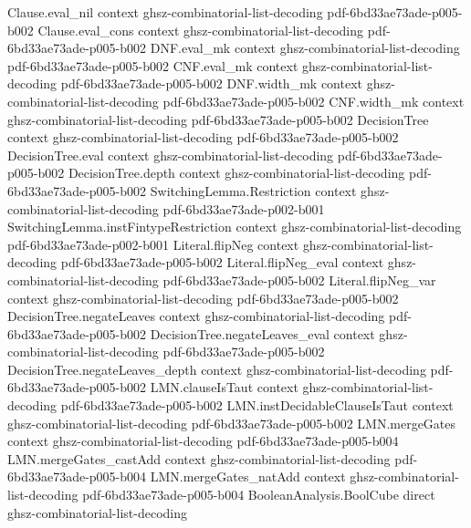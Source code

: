 \begin{theorem}
\proofstep
  {Clause.eval_nil}
  {context}
  {ghsz-combinatorial-list-decoding}
  {pdf-6bd33ae73ade-p005-b002}
\proofstep
  {Clause.eval_cons}
  {context}
  {ghsz-combinatorial-list-decoding}
  {pdf-6bd33ae73ade-p005-b002}
\proofstep
  {DNF.eval_mk}
  {context}
  {ghsz-combinatorial-list-decoding}
  {pdf-6bd33ae73ade-p005-b002}
\proofstep
  {CNF.eval_mk}
  {context}
  {ghsz-combinatorial-list-decoding}
  {pdf-6bd33ae73ade-p005-b002}
\proofstep
  {DNF.width_mk}
  {context}
  {ghsz-combinatorial-list-decoding}
  {pdf-6bd33ae73ade-p005-b002}
\proofstep
  {CNF.width_mk}
  {context}
  {ghsz-combinatorial-list-decoding}
  {pdf-6bd33ae73ade-p005-b002}
\proofstep
  {DecisionTree}
  {context}
  {ghsz-combinatorial-list-decoding}
  {pdf-6bd33ae73ade-p005-b002}
\proofstep
  {DecisionTree.eval}
  {context}
  {ghsz-combinatorial-list-decoding}
  {pdf-6bd33ae73ade-p005-b002}
\proofstep
  {DecisionTree.depth}
  {context}
  {ghsz-combinatorial-list-decoding}
  {pdf-6bd33ae73ade-p005-b002}
\proofstep
  {SwitchingLemma.Restriction}
  {context}
  {ghsz-combinatorial-list-decoding}
  {pdf-6bd33ae73ade-p002-b001}
\proofstep
  {SwitchingLemma.instFintypeRestriction}
  {context}
  {ghsz-combinatorial-list-decoding}
  {pdf-6bd33ae73ade-p002-b001}
\proofstep
  {Literal.flipNeg}
  {context}
  {ghsz-combinatorial-list-decoding}
  {pdf-6bd33ae73ade-p005-b002}
\proofstep
  {Literal.flipNeg_eval}
  {context}
  {ghsz-combinatorial-list-decoding}
  {pdf-6bd33ae73ade-p005-b002}
\proofstep
  {Literal.flipNeg_var}
  {context}
  {ghsz-combinatorial-list-decoding}
  {pdf-6bd33ae73ade-p005-b002}
\proofstep
  {DecisionTree.negateLeaves}
  {context}
  {ghsz-combinatorial-list-decoding}
  {pdf-6bd33ae73ade-p005-b002}
\proofstep
  {DecisionTree.negateLeaves_eval}
  {context}
  {ghsz-combinatorial-list-decoding}
  {pdf-6bd33ae73ade-p005-b002}
\proofstep
  {DecisionTree.negateLeaves_depth}
  {context}
  {ghsz-combinatorial-list-decoding}
  {pdf-6bd33ae73ade-p005-b002}
\proofstep
  {LMN.clauseIsTaut}
  {context}
  {ghsz-combinatorial-list-decoding}
  {pdf-6bd33ae73ade-p005-b002}
\proofstep
  {LMN.instDecidableClauseIsTaut}
  {context}
  {ghsz-combinatorial-list-decoding}
  {pdf-6bd33ae73ade-p005-b002}
\proofstep
  {LMN.mergeGates}
  {context}
  {ghsz-combinatorial-list-decoding}
  {pdf-6bd33ae73ade-p005-b004}
\proofstep
  {LMN.mergeGates_castAdd}
  {context}
  {ghsz-combinatorial-list-decoding}
  {pdf-6bd33ae73ade-p005-b004}
\proofstep
  {LMN.mergeGates_natAdd}
  {context}
  {ghsz-combinatorial-list-decoding}
  {pdf-6bd33ae73ade-p005-b004}
\proofstep
  {BooleanAnalysis.BoolCube}
  {direct}
  {ghsz-combinatorial-list-decoding}

\end{theorem}
